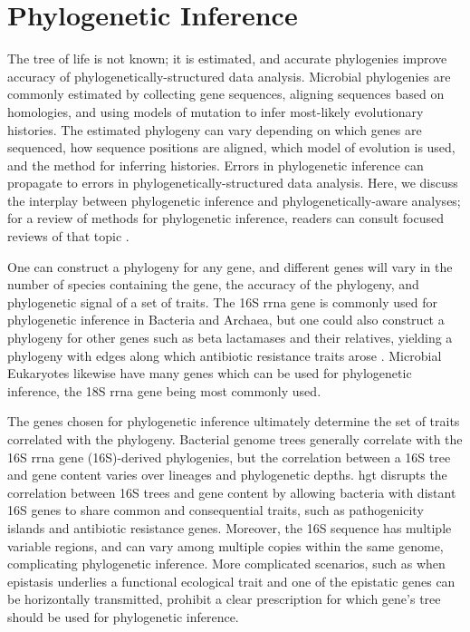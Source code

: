 \section{Phylogenetic Inference}
The tree of life is not known; it is estimated, and accurate phylogenies improve accuracy of phylogenetically-structured data analysis. Microbial phylogenies are commonly estimated by collecting gene sequences, aligning sequences based on homologies, and using models of mutation to infer most-likely evolutionary histories. The estimated phylogeny can vary depending on which genes are sequenced, how sequence positions are aligned, which model of evolution is used, and the method for inferring histories. Errors in phylogenetic inference can propagate to errors in phylogenetically-structured data analysis. Here, we discuss the interplay between phylogenetic inference and phylogenetically-aware analyses; for a review of methods for phylogenetic inference, readers can consult focused reviews of that topic \cite{molecular_evolution, molecular_phylogenetics}.\par
One can construct a phylogeny for any gene, and different genes will vary in the number of species containing the gene, the accuracy of the phylogeny, and phylogenetic signal of a set of traits. The 16S \gls{rrna} gene is commonly used for phylogenetic inference in Bacteria and Archaea, but one could also construct a phylogeny for other genes such as beta lactamases and their relatives, yielding a phylogeny with edges along which antibiotic resistance traits arose \cite{molecular_evolution}. Microbial Eukaryotes likewise have many genes which can be used for phylogenetic inference, the 18S \gls{rrna} gene being most commonly used\cite{hillis_ribosome}. \par
The genes chosen for phylogenetic inference ultimately determine the set of traits correlated with the phylogeny. Bacterial genome trees generally correlate with the 16S \gls{rrna} gene (16S)-derived phylogenies\cite{snel_genome_phylogeny}, but the correlation between a 16S tree and gene content varies over lineages and phylogenetic depths\cite{zaneveld_ribosome}. \gls{hgt} disrupts the correlation between 16S trees and gene content by allowing bacteria with distant 16S genes to share common and consequential traits, such as pathogenicity islands and antibiotic resistance genes\cite{hall_lactamase,prokaryotic_evolution}. Moreover, the 16S sequence has multiple variable regions, and can vary among multiple copies within the same genome, complicating phylogenetic inference\cite{variability_16s}. More complicated scenarios, such as when epistasis underlies a functional ecological trait and one of the epistatic genes can be horizontally transmitted, prohibit a clear prescription for which gene's tree should be used for phylogenetic inference.\par
